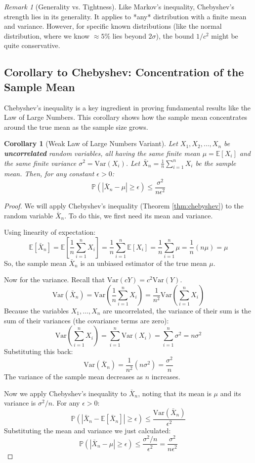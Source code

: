 \documentclass[11pt, letterpaper]{article}
\theoremstyle{plain} %
\newtheorem{corollary}[theorem]{Corollary}
\theoremstyle{definition} %
\theoremstyle{remark} %
\newtheorem{remark}[theorem]{Remark}
\newcommand{\E}{\mathbb{E}} %
\newcommand{\Var}{\text{Var}} %
\newcommand{\Prob}{\mathbb{P}} %
\begin{document}
\begin{remark}[Generality vs. Tightness]
Like Markov's inequality, Chebyshev's strength lies in its generality. It applies to *any* distribution with a finite mean and variance. However, for specific known distributions (like the normal distribution, where we know $\approx 5\%$ lies beyond $2\sigma$), the bound $1/c^2$ might be quite conservative.
\end{remark}

\subsection{Corollary to Chebyshev: Concentration of the Sample Mean}

Chebyshev's inequality is a key ingredient in proving fundamental results like the Law of Large Numbers. This corollary shows how the sample mean concentrates around the true mean as the sample size grows.

\begin{corollary}[Weak Law of Large Numbers Variant] \label{cor:chebyshev_wlln}
Let $X_1, X_2, \dots, X_n$ be \textbf{uncorrelated} random variables, all having the same finite mean $\mu = \E[X_i]$ and the same finite variance $\sigma^2 = \Var(X_i)$. Let $\bar{X}_n = \frac{1}{n} \sum_{i=1}^n X_i$ be the sample mean.
Then, for any constant $\epsilon > 0$:
\[
\Prob(|\bar{X}_n - \mu| \ge \epsilon) \le \frac{\sigma^2}{n \epsilon^2}
\]
\end{corollary}

\begin{proof}
We will apply Chebyshev's inequality (Theorem \ref{thm:chebyshev}) to the random variable $\bar{X}_n$. To do this, we first need its mean and variance.

Using linearity of expectation:
\[
\E[\bar{X}_n] = \E\left[\frac{1}{n} \sum_{i=1}^n X_i\right] = \frac{1}{n} \sum_{i=1}^n \E[X_i] = \frac{1}{n} \sum_{i=1}^n \mu = \frac{1}{n} (n \mu) = \mu
\]
So, the sample mean $\bar{X}_n$ is an unbiased estimator of the true mean $\mu$.

Now for the variance. Recall that $\Var(cY) = c^2 \Var(Y)$.
\[
\Var(\bar{X}_n) = \Var\left(\frac{1}{n} \sum_{i=1}^n X_i\right) = \frac{1}{n^2} \Var\left(\sum_{i=1}^n X_i\right)
\]
Because the variables $X_1, \dots, X_n$ are uncorrelated, the variance of their sum is the sum of their variances (the covariance terms are zero):
\[
\Var\left(\sum_{i=1}^n X_i\right) = \sum_{i=1}^n \Var(X_i) = \sum_{i=1}^n \sigma^2 = n \sigma^2
\]
Substituting this back:
\[
\Var(\bar{X}_n) = \frac{1}{n^2} (n \sigma^2) = \frac{\sigma^2}{n}
\]
The variance of the sample mean decreases as $n$ increases.

Now we apply Chebyshev's inequality to $\bar{X}_n$, noting that its mean is $\mu$ and its variance is $\sigma^2/n$. For any $\epsilon > 0$:
\[
\Prob(|\bar{X}_n - \E[\bar{X}_n]| \ge \epsilon) \le \frac{\Var(\bar{X}_n)}{\epsilon^2}
\]
Substituting the mean and variance we just calculated:
\[
\Prob(|\bar{X}_n - \mu| \ge \epsilon) \le \frac{\sigma^2/n}{\epsilon^2} = \frac{\sigma^2}{n \epsilon^2}
\]
\end{proof}
\end{document}
